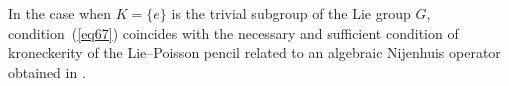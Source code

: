 \begin{Remark}\label{remarr} In the case when $K=\{e\}$ is the trivial subgroup of the Lie group $G$, condition~(\ref{eq67}) coincides with the necessary and sufficient condition of kroneckerity of the Lie--Poisson pencil related to an algebraic Nijenhuis operator obtained in \cite[Theorem~2.5]{p5}.
\end{Remark}

